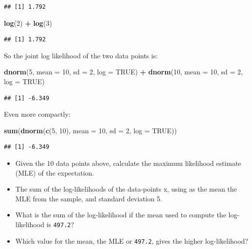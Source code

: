 \documentclass[12pt,]{krantz}
\newenvironment{Shaded}{\begin{snugshade}}{\end{snugshade}}
\newcommand{\DataTypeTok}[1]{\textcolor[rgb]{0.13,0.29,0.53}{#1}}
\newcommand{\DecValTok}[1]{\textcolor[rgb]{0.00,0.00,0.81}{#1}}
\newcommand{\KeywordTok}[1]{\textcolor[rgb]{0.13,0.29,0.53}{\textbf{#1}}}
\newcommand{\NormalTok}[1]{#1}
\newcommand{\OperatorTok}[1]{\textcolor[rgb]{0.81,0.36,0.00}{\textbf{#1}}}
\newcommand{\OtherTok}[1]{\textcolor[rgb]{0.56,0.35,0.01}{#1}}
\newcommand{\StringTok}[1]{\textcolor[rgb]{0.31,0.60,0.02}{#1}}
\providecommand{\tightlist}{%
  \setlength{\itemsep}{0pt}\setlength{\parskip}{0pt}}
\begin{document}
\begin{verbatim}
## [1] 1.792
\end{verbatim}

\begin{Shaded}
\begin{Highlighting}[]
\KeywordTok{log}\NormalTok{(}\DecValTok{2}\NormalTok{) }\OperatorTok{+}\StringTok{ }\KeywordTok{log}\NormalTok{(}\DecValTok{3}\NormalTok{)}
\end{Highlighting}
\end{Shaded}

\begin{verbatim}
## [1] 1.792
\end{verbatim}

So the joint log likelihood of the two data points is:

\begin{Shaded}
\begin{Highlighting}[]
\KeywordTok{dnorm}\NormalTok{(}\DecValTok{5}\NormalTok{, }\DataTypeTok{mean =} \DecValTok{10}\NormalTok{, }\DataTypeTok{sd =} \DecValTok{2}\NormalTok{, }\DataTypeTok{log =} \OtherTok{TRUE}\NormalTok{) }\OperatorTok{+}\StringTok{ }\KeywordTok{dnorm}\NormalTok{(}\DecValTok{10}\NormalTok{, }
  \DataTypeTok{mean =} \DecValTok{10}\NormalTok{, }\DataTypeTok{sd =} \DecValTok{2}\NormalTok{, }\DataTypeTok{log =} \OtherTok{TRUE}\NormalTok{)}
\end{Highlighting}
\end{Shaded}

\begin{verbatim}
## [1] -6.349
\end{verbatim}

Even more compactly:

\begin{Shaded}
\begin{Highlighting}[]
\KeywordTok{sum}\NormalTok{(}\KeywordTok{dnorm}\NormalTok{(}\KeywordTok{c}\NormalTok{(}\DecValTok{5}\NormalTok{, }\DecValTok{10}\NormalTok{), }\DataTypeTok{mean =} \DecValTok{10}\NormalTok{, }\DataTypeTok{sd =} \DecValTok{2}\NormalTok{, }\DataTypeTok{log =} \OtherTok{TRUE}\NormalTok{))}
\end{Highlighting}
\end{Shaded}

\begin{verbatim}
## [1] -6.349
\end{verbatim}

\begin{itemize}
\tightlist
\item
  Given the 10 data points above, calculate the maximum likelihood estimate (MLE) of the expectation.
\item
  The sum of the log-likelihoods of the data-points x, using as the mean the MLE from the sample, and standard deviation 5.
\item
  What is the sum of the log-likelihood if the mean used to compute the log-likelihood is \texttt{497.2}?
\item
  Which value for the mean, the MLE or \texttt{497.2}, gives the higher log-likelihood?
\end{itemize}
\end{document}
